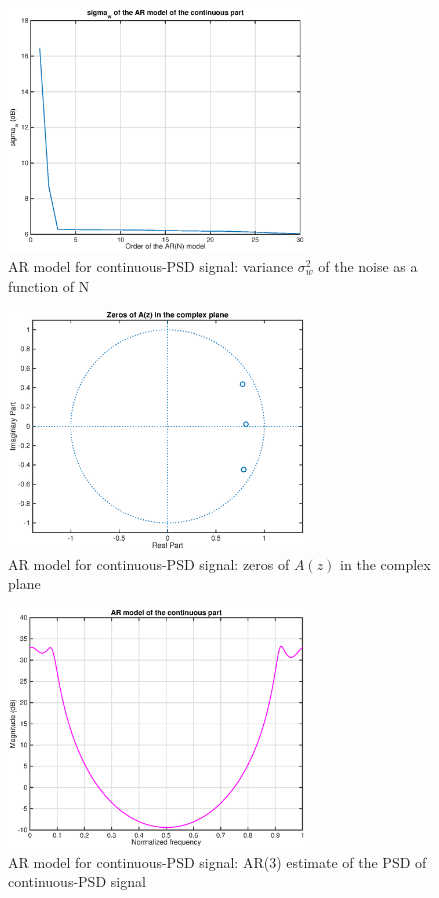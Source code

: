 \documentclass[10pt]{article}
\numberwithin{equation}{section}
\begin{document}
\begin{figure}[h!]
  \centering
  \includegraphics[width = 0.7\textwidth]{images/ar_continuous_sigma}
  \caption{AR model for continuous-PSD signal: variance $\sigma_w^2$ of the noise as a function of N}
  \label{fig:ar_cont_sigma}
\end{figure}

\begin{figure}[h!]
  \centering
  \includegraphics[width = 0.7\textwidth]{images/ar_continuous_zeros}
  \caption{AR model for continuous-PSD signal: zeros of $A(z)$ in the complex plane}
  \label{fig:zpl_cont}
\end{figure}

\begin{figure}[h!]
  \centering
  \includegraphics[width = 0.7\textwidth]{images/ar_continuous_psd}
  \caption{AR model for continuous-PSD signal: AR(3) estimate of the PSD of continuous-PSD signal}
  \label{fig:psd_cont}
\end{figure}
\end{document}
